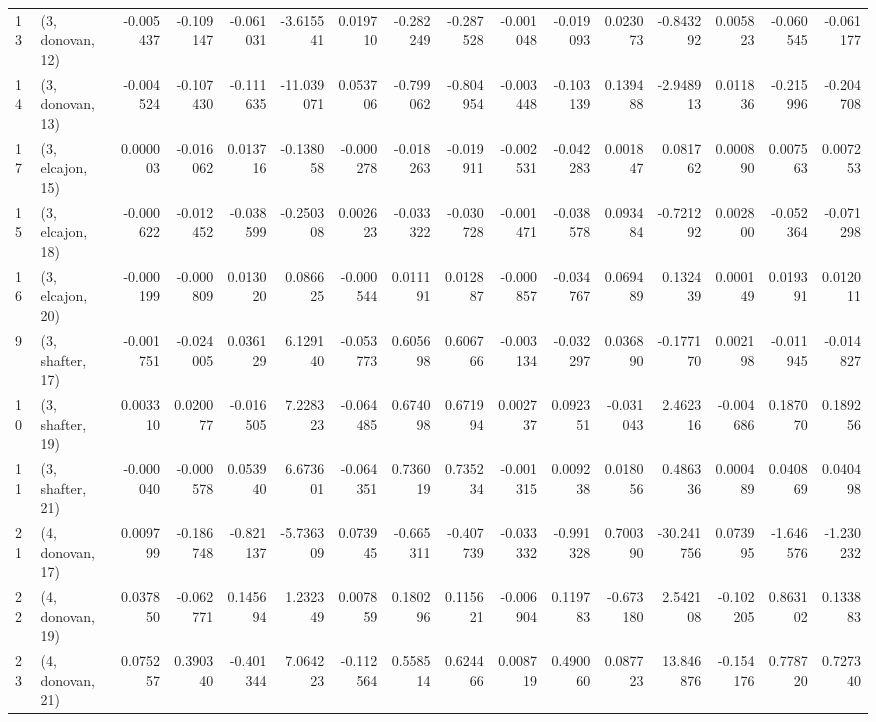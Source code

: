 \begin{tabular}{llrrrrrrrrrrrrrr}
13 &  (3, donovan, 12) &  -0.005437 & -0.109147 & -0.061031 &  -3.615541 &  0.019710 &  -0.282249 & -0.287528 & -0.001048 & -0.019093 &  0.023073 &  -0.843292 &  0.005823 & -0.060545 & -0.061177 \\
14 &  (3, donovan, 13) &  -0.004524 & -0.107430 & -0.111635 & -11.039071 &  0.053706 &  -0.799062 & -0.804954 & -0.003448 & -0.103139 &  0.139488 &  -2.948913 &  0.011836 & -0.215996 & -0.204708 \\
17 &  (3, elcajon, 15) &   0.000003 & -0.016062 &  0.013716 &  -0.138058 & -0.000278 &  -0.018263 & -0.019911 & -0.002531 & -0.042283 &  0.001847 &   0.081762 &  0.000890 &  0.007563 &  0.007253 \\
15 &  (3, elcajon, 18) &  -0.000622 & -0.012452 & -0.038599 &  -0.250308 &  0.002623 &  -0.033322 & -0.030728 & -0.001471 & -0.038578 &  0.093484 &  -0.721292 &  0.002800 & -0.052364 & -0.071298 \\
16 &  (3, elcajon, 20) &  -0.000199 & -0.000809 &  0.013020 &   0.086625 & -0.000544 &   0.011191 &  0.012887 & -0.000857 & -0.034767 &  0.069489 &   0.132439 &  0.000149 &  0.019391 &  0.012011 \\
9  &  (3, shafter, 17) &  -0.001751 & -0.024005 &  0.036129 &   6.129140 & -0.053773 &   0.605698 &  0.606766 & -0.003134 & -0.032297 &  0.036890 &  -0.177170 &  0.002198 & -0.011945 & -0.014827 \\
10 &  (3, shafter, 19) &   0.003310 &  0.020077 & -0.016505 &   7.228323 & -0.064485 &   0.674098 &  0.671994 &  0.002737 &  0.092351 & -0.031043 &   2.462316 & -0.004686 &  0.187070 &  0.189256 \\
11 &  (3, shafter, 21) &  -0.000040 & -0.000578 &  0.053940 &   6.673601 & -0.064351 &   0.736019 &  0.735234 & -0.001315 &  0.009238 &  0.018056 &   0.486336 &  0.000489 &  0.040869 &  0.040498 \\
21 &  (4, donovan, 17) &   0.009799 & -0.186748 & -0.821137 &  -5.736309 &  0.073945 &  -0.665311 & -0.407739 & -0.033332 & -0.991328 &  0.700390 & -30.241756 &  0.073995 & -1.646576 & -1.230232 \\
22 &  (4, donovan, 19) &   0.037850 & -0.062771 &  0.145694 &   1.232349 &  0.007859 &   0.180296 &  0.115621 & -0.006904 &  0.119783 & -0.673180 &   2.542108 & -0.102205 &  0.863102 &  0.133883 \\
23 &  (4, donovan, 21) &   0.075257 &  0.390340 & -0.401344 &   7.064223 & -0.112564 &   0.558514 &  0.624466 &  0.008719 &  0.490060 &  0.087723 &  13.846876 & -0.154176 &  0.778720 &  0.727340 \\

\end{tabular}
